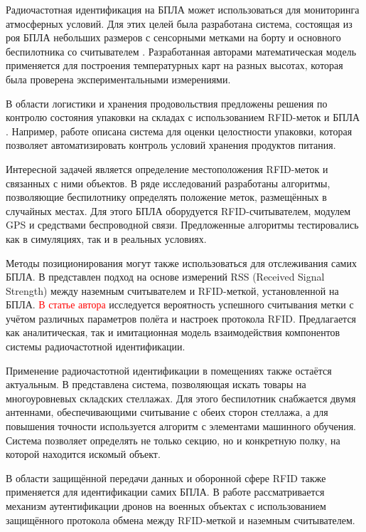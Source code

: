 \documentclass[12pt]{article}
\theoremstyle{definition}
\begin{document}
Радиочастотная идентификация на БПЛА может использоваться для мониторинга атмосферных условий. Для этих целей была разработана система, состоящая из роя БПЛА небольших размеров с сенсорными метками на борту и основного беспилотника со считывателем \cite{Longhi2016, Longhi2017, Longhi2017a}. Разработанная авторами математическая модель применяется для построения температурных карт на разных высотах, которая была проверена экспериментальными измерениями.

В области логистики и хранения продовольствия предложены решения по контролю состояния упаковки на складах с использованием RFID-меток и БПЛА \cite{Kapoor2024}. Например, работе \cite{Almalki2020} описана система для оценки целостности упаковки, которая позволяет автоматизировать контроль условий хранения продуктов питания.

Интересной задачей является определение местоположения RFID-меток и связанных с ними объектов. В ряде исследований \cite{Buffi2017,Buffi2018,Buffi2018a,Buffi2019,Aouladhadj2023} разработаны алгоритмы, позволяющие беспилотнику определять положение меток, размещённых в случайных местах. Для этого БПЛА оборудуется RFID-считывателем, модулем GPS и средствами беспроводной связи. Предложенные алгоритмы тестировались как в симуляциях, так и в реальных условиях.

Методы позиционирования могут также использоваться для отслеживания самих БПЛА. В \cite{Habaebi2020} представлен подход на основе измерений RSS (Received Signal Strength) между наземным считывателем и RFID-меткой, установленной на БПЛА. \textcolor{red}{В статье автора} \cite{Abramian2022} исследуется вероятность успешного считывания метки с учётом различных параметров полёта и настроек протокола RFID. Предлагается как аналитическая, так и имитационная модель взаимодействия компонентов системы радиочастотной идентификации.

Применение радиочастотной идентификации в помещениях также остаётся актуальным. В \cite{Li2021} представлена система, позволяющая искать товары на многоуровневых складских стеллажах. Для этого беспилотник снабжается двумя антеннами, обеспечивающими считывание с обеих сторон стеллажа, а для повышения точности используется алгоритм с элементами машинного обучения. Система позволяет определять не только секцию, но и конкретную полку, на которой находится искомый объект.

В области защищённой передачи данных \cite{Shariq2024} и оборонной сфере RFID также применяется для идентификации самих БПЛА. В работе \cite{Gope2021} рассматривается механизм аутентификации дронов на военных объектах с использованием защищённого протокола обмена между RFID-меткой и наземным считывателем.
\end{document}
